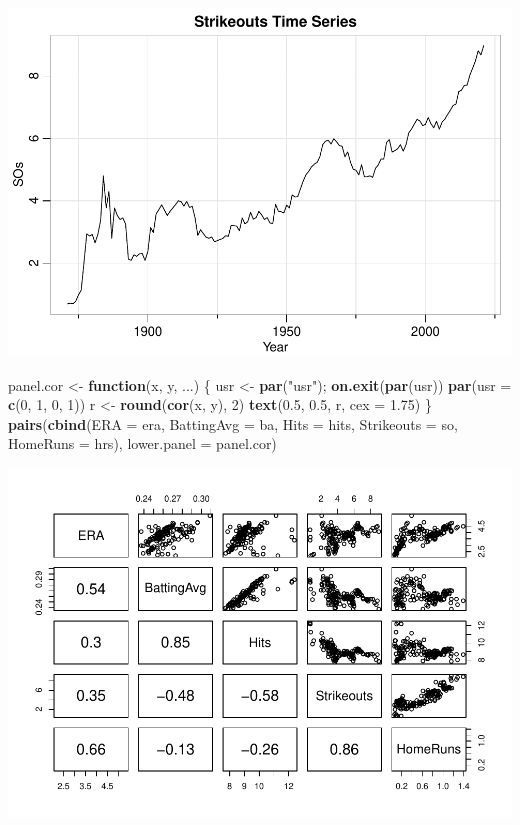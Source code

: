 \documentclass[
]{article}
\newenvironment{Shaded}{\begin{snugshade}}{\end{snugshade}}
\newcommand{\ControlFlowTok}[1]{\textcolor[rgb]{0.13,0.29,0.53}{\textbf{#1}}}
\newcommand{\DataTypeTok}[1]{\textcolor[rgb]{0.13,0.29,0.53}{#1}}
\newcommand{\DecValTok}[1]{\textcolor[rgb]{0.00,0.00,0.81}{#1}}
\newcommand{\FloatTok}[1]{\textcolor[rgb]{0.00,0.00,0.81}{#1}}
\newcommand{\KeywordTok}[1]{\textcolor[rgb]{0.13,0.29,0.53}{\textbf{#1}}}
\newcommand{\NormalTok}[1]{#1}
\newcommand{\StringTok}[1]{\textcolor[rgb]{0.31,0.60,0.02}{#1}}
\begin{document}
\includegraphics{project_files/figure-latex/unnamed-chunk-5-1.pdf}

\begin{Shaded}
\begin{Highlighting}[]
\NormalTok{panel.cor <-}\StringTok{ }\ControlFlowTok{function}\NormalTok{(x, y, ...) \{}
\NormalTok{  usr <-}\StringTok{ }\KeywordTok{par}\NormalTok{(}\StringTok{"usr"}\NormalTok{); }\KeywordTok{on.exit}\NormalTok{(}\KeywordTok{par}\NormalTok{(usr))}
  \KeywordTok{par}\NormalTok{(}\DataTypeTok{usr =} \KeywordTok{c}\NormalTok{(}\DecValTok{0}\NormalTok{, }\DecValTok{1}\NormalTok{, }\DecValTok{0}\NormalTok{, }\DecValTok{1}\NormalTok{))}
\NormalTok{  r <-}\StringTok{ }\KeywordTok{round}\NormalTok{(}\KeywordTok{cor}\NormalTok{(x, y), }\DecValTok{2}\NormalTok{)}
  \KeywordTok{text}\NormalTok{(}\FloatTok{0.5}\NormalTok{, }\FloatTok{0.5}\NormalTok{, r, }\DataTypeTok{cex =} \FloatTok{1.75}\NormalTok{)}
\NormalTok{\}}
\KeywordTok{pairs}\NormalTok{(}\KeywordTok{cbind}\NormalTok{(}\DataTypeTok{ERA =}\NormalTok{ era, }\DataTypeTok{BattingAvg =}\NormalTok{ ba, }\DataTypeTok{Hits =}\NormalTok{ hits, }\DataTypeTok{Strikeouts =}\NormalTok{ so, }\DataTypeTok{HomeRuns =}\NormalTok{ hrs), }\DataTypeTok{lower.panel =}\NormalTok{ panel.cor)}
\end{Highlighting}
\end{Shaded}

\includegraphics{project_files/figure-latex/unnamed-chunk-6-1.pdf}
\end{document}
